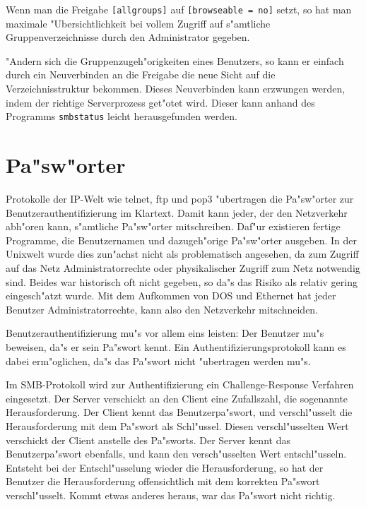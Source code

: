 \documentclass{scrartcl}
\newcommand{\prog}{\texttt}
\newcommand{\param}{\texttt}
\begin{document}
Wenn man die Freigabe \param{[allgroups]} auf \param{[browseable =
  no]} setzt, so hat man maximale "Ubersichtlichkeit bei vollem
Zugriff auf s"amtliche Gruppenverzeichnisse durch den Administrator
gegeben.

"Andern sich die Gruppenzugeh"origkeiten eines Benutzers, so kann
er einfach durch ein Neuverbinden an die Freigabe die neue Sicht auf
die Verzeichnisstruktur bekommen. Dieses Neuverbinden kann erzwungen
werden, indem der richtige Serverprozess get"otet wird. Dieser kann
anhand des Programms \prog{smbstatus} leicht herausgefunden werden.

\section{Pa"sw"orter}
\label{passwoerter}

Protokolle der IP-Welt wie telnet, ftp und pop3 "ubertragen die
Pa"sw"orter zur Benutzerauthentifizierung im Klartext. Damit kann
jeder, der den Netzverkehr abh"oren kann, s"amtliche Pa"sw"orter
mitschreiben. Daf"ur existieren fertige Programme, die Benutzernamen
und dazugeh"orige Pa"sw"orter ausgeben. In der Unixwelt wurde dies
zun"achst nicht als problematisch angesehen, da zum Zugriff auf das
Netz Administratorrechte oder physikalischer Zugriff zum Netz
notwendig sind. Beides war historisch oft nicht gegeben, so da"s das
Risiko als relativ gering eingesch"atzt wurde. Mit dem Aufkommen von
DOS und Ethernet hat jeder Benutzer Administratorrechte, kann also den
Netzverkehr mitschneiden.

Benutzerauthentifizierung mu"s vor allem eins leisten: Der Benutzer
mu"s beweisen, da"s er sein Pa"swort kennt. Ein
Authentifizierungsprotokoll kann es dabei erm"oglichen, da"s das
Pa"swort nicht "ubertragen werden mu"s.

Im SMB-Protokoll wird zur Authentifizierung ein Challenge-Response
Verfahren eingesetzt. Der Server verschickt an den Client eine
Zufallszahl, die sogenannte Herausforderung. Der Client kennt das
Benutzerpa"swort, und verschl"usselt die Herausforderung mit dem
Pa"swort als Schl"ussel. Diesen verschl"usselten Wert verschickt der
Client anstelle des Pa"sworts. Der Server kennt das Benutzerpa"swort
ebenfalls, und kann den versch"usselten Wert entschl"usseln. Entsteht
bei der Entschl"usselung wieder die Herausforderung, so hat der
Benutzer die Herausforderung offensichtlich mit dem korrekten Pa"swort
verschl"usselt. Kommt etwas anderes heraus, war das Pa"swort nicht
richtig.
\end{document}
